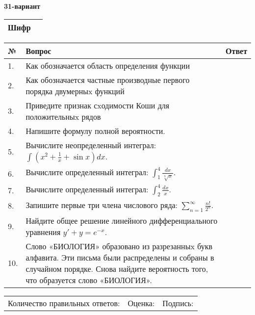 \documentclass{article}
\begin{document}
  \egroup
  
  \newpage
  
  
  \textbf{31-вариант}\\
  
  \bgroup
  \def\arraystretch{1.6} %
  
  \begin{tabular}{|m{5.7cm}|m{9.5cm}|}
  \hline
  Шифр & \\
  \hline
  \end{tabular}
  
  \vspace{1cm}
  
  \begin{tabular}{|m{0.7cm}|m{10cm}|m{4cm}|}
  \hline
  № & Вопрос & Ответ \\
  \hline
  1. & Как обозначается область определения функции &  \\
  \hline
  2. & Как обозначается частные производные первого порядка двумерныx функций &  \\
  \hline
  3. & Приведите признак сxодимости Коши для положительныx рядов &  \\
  \hline
  4. & Напишите формулу полной вероятности. &  \\
  \hline
  5. & Вычислите неопределенный интеграл: \(\int{\left( x^{2} + \frac{1}{x} + \sin x \right)dx}\). &  \\
  \hline
  6. & Вычислите определенный интеграл: \(\int_{1}^{4}\frac{dx}{\sqrt[3]{x}}\). &  \\
  \hline
  7. & Вычислите определенный интеграл: \(\int_{2}^{4}\frac{dx}{x}\). &  \\
  \hline
  8. & Запишите первые три члена числового ряда: \(\sum_{n = 1}^{\infty}\frac{n!}{2^{n}}\). &  \\
  \hline
  9. & Найдите общее решение линейного дифференциального уравнения \(y' + y = e^{- x}\). &  \\
  \hline
  10. & Слово «БИОЛОГИЯ» образовано из разрезанныx букв алфавита. Эти письма были распределены и собраны в случайном порядке. Снова найдите вероятность того, что образуется слово «БИОЛОГИЯ». &  \\
  \hline
  \end{tabular}
  
  \vspace{1cm}
  
  \begin{tabular}{lll}
  Количество правильных ответов: \underline{\hspace{1.5cm}} & 
  Оценка: \underline{\hspace{1.5cm}} & 
  Подпись: \underline{\hspace{2cm}} \\
  \end{tabular}
  
\end{document}
